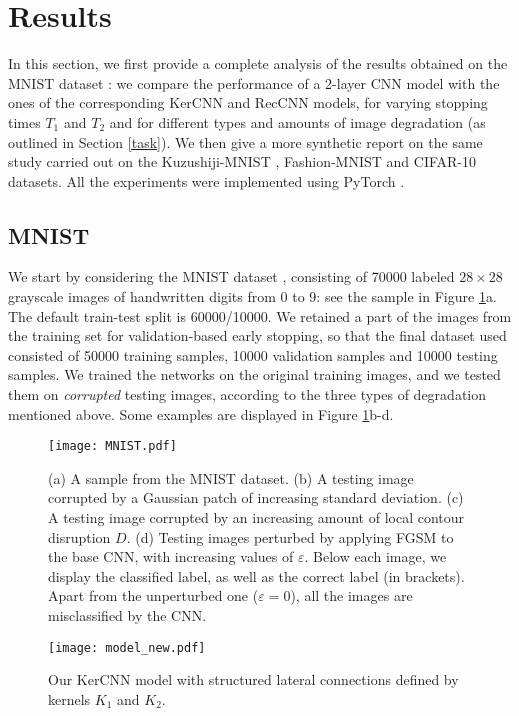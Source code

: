 \documentclass[11pt,oneside,reqno]{amsart}
\begin{document}
 
 \section{Results}\label{results}
 In this section, we first provide a complete analysis of the results obtained on the MNIST dataset \citep{mnist}: we compare the performance of a 2-layer CNN model with the ones of the corresponding KerCNN and RecCNN models, for varying stopping times $T_1$ and $T_2$ and for different types and amounts of image degradation (as outlined in Section \ref{task}). We then give a more synthetic report on the same study carried out on the Kuzushiji-MNIST \citep{kmnist}, Fashion-MNIST \citep{fashion} and CIFAR-10 \citep{cifar} datasets. All the experiments were implemented using PyTorch \citep{pytorch}.

 
 \subsection{MNIST}\label{resmnist}
 We start by considering the MNIST dataset \citep{mnist}, consisting of 70000 labeled $28\times 28$ grayscale images of handwritten digits from 0 to 9: see the sample in Figure \ref{MNIST}a. The default train-test split is 60000/10000. We retained a part of the images from the training set for validation-based early stopping, so that the final dataset used consisted of 50000 training samples, 10000 validation samples and 10000 testing samples. We trained the networks on the original training images, and we tested them on \emph{corrupted} testing images, according to the three types of degradation mentioned above. Some examples are displayed in Figure \ref{MNIST}b-d. 
 \begin{figure}[htbp!]
 \centering
 \texttt{[image: MNIST.pdf]}
 \caption{(a) A sample from the MNIST dataset. (b) A testing image corrupted by a Gaussian patch of increasing standard deviation. (c) A testing image corrupted by an increasing amount of local contour disruption $D$. (d) Testing images perturbed by applying FGSM to the base CNN, with increasing values of $\varepsilon$. Below each image, we display the classified label, as well as the correct label (in brackets). Apart from the unperturbed one ($\varepsilon=0$), all the images are misclassified by the CNN.}\label{MNIST}
 \end{figure}

 \begin{figure}[htbp!]
 \centering
 \texttt{[image: model\_new.pdf]}
 \caption{Our KerCNN model with structured lateral connections defined by kernels $K_1$ and $K_2$.}\label{model}
 \end{figure}
\end{document}
